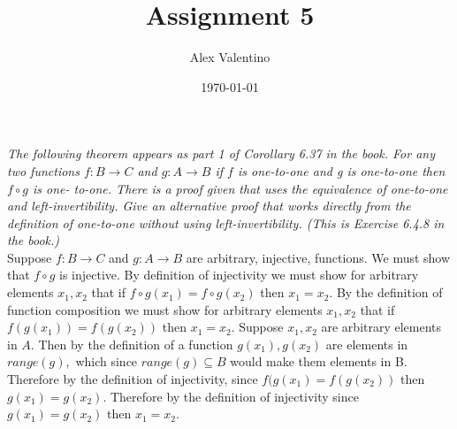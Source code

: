 \documentclass[12pt, letterpaper]{article}
\date{\today}
\author{Alex Valentino}
\title{Assignment 5}
\begin{document}
	\textit{The following theorem appears as part 1 of Corollary 6.37 in the book. For any two
functions $f : B \to C$ and $g : A \to B$ if $f$ is one-to-one and g is one-to-one then $f\circ g$ is one-
to-one. There is a proof given that uses the equivalence of one-to-one and left-invertibility.
Give an alternative proof that works directly from the definition of one-to-one without using
left-invertibility. (This is Exercise 6.4.8 in the book.)}\\

	Suppose $f : B \to C$ and $g : A \to B$ are arbitrary, injective, functions.  We must show that $f \circ g$ is injective.  By definition of injectivity we must show for arbitrary elements $x_1, x_2$ that if $f \circ g (x_1) = f \circ g (x_2)$ then $x_1 = x_2.$  By the definition of function composition we must show for arbitrary elements $x_1, x_2$ that if $f (g (x_1)) = f (g (x_2))$ then $x_1 = x_2.$ Suppose $x_1, x_2$ are arbitrary elements in $A$.  Then by the definition of a function $g(x_1), g(x_2)$ are elements in $range(g), $ which since $range(g) \subseteq B$ would make them elements in B.  Therefore by the definition of injectivity, since $f(g(x_1) = f(g(x_2))$ then $g(x_1)=g(x_2).$  Therefore by the definition of injectivity since  $g(x_1)=g(x_2)$ then $x_1 = x_2.$
\end{document}
